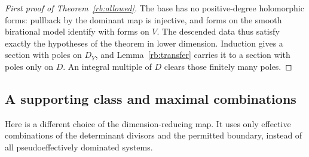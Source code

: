 \begin{proof}[First proof of Theorem~\ref{rb:allowed}]
The base has no positive-degree holomorphic forms: pullback by the
dominant map is injective, and forms on the smooth birational model
identify with forms on $V$.  The descended data thus satisfy exactly
the hypotheses of the theorem in lower dimension.  Induction gives a
section with poles on $D_Y$, and Lemma~\ref{rb:transfer} carries it to
a section with poles only on $D$.  An integral multiple of $D$ clears
those finitely many poles.
\end{proof}

\subsection{A supporting class and maximal combinations}
\label{rb:zero-degree}

Here is a different choice of the dimension-reducing map.  It uses
only effective combinations of the determinant divisors and the
permitted boundary, instead of all pseudoeffectively dominated
systems.

